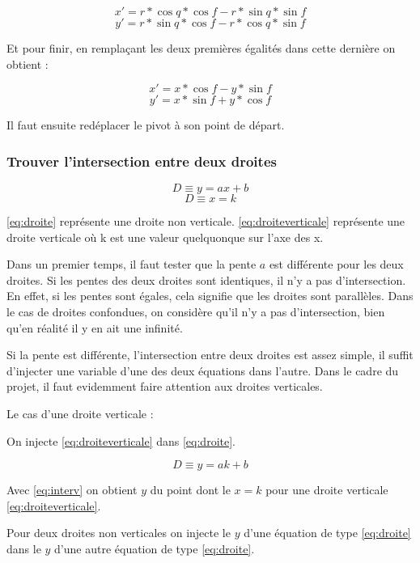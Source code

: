 \documentclass[]{article}
\begin{document}
$$ x' = r * \cos{q} * \cos{f} - r * \sin{q} * \sin{f} $$
$$ y' = r * \sin{q} * \cos{f} - r * \cos{q} * \sin{f} $$

Et pour finir, en remplaçant les deux premières égalités dans cette dernière on obtient : 

$$ x' = x * \cos{f} - y * \sin{f} $$
$$ y' = x * \sin{f} + y * \cos{f} $$

Il faut ensuite redéplacer le pivot à son point de départ.

\subsubsection{Trouver l'intersection entre deux droites}



\begin{equation} \label{eq:droite}
	D \equiv y = ax + b 
\end{equation}
\begin{equation} \label{eq:droiteverticale}
	D \equiv x = k 
\end{equation}


\eqref {eq:droite} 
représente une droite non verticale.
\eqref {eq:droiteverticale} 
représente une droite verticale où k est une valeur
quelquonque sur l'axe des x.

Dans un premier temps, il faut tester que la pente $a$ est différente 
pour les deux droites. 
Si les pentes des deux droites sont identiques, il n'y a pas d'intersection.
En effet, si les pentes sont égales, cela signifie que les droites sont parallèles.
Dans le cas de droites confondues, on considère qu'il
n'y a pas d'intersection, bien qu'en réalité il y en ait une infinité.

Si la pente est différente,
l'intersection entre deux droites est assez simple, il suffit 
d'injecter une variable d'une des deux équations dans l'autre.
Dans le cadre du projet, il faut evidemment faire attention aux 
droites verticales.

Le cas d'une droite verticale : 

On injecte \eqref{eq:droiteverticale} dans \eqref{eq:droite}.

\begin{equation} \label{eq:interv}
	D \equiv y = ak + b
\end{equation}

Avec \eqref{eq:interv} on obtient $y$ du point dont le $x = k$
pour une droite verticale \eqref{eq:droiteverticale}.

Pour deux droites non verticales on injecte le $y$ d'une équation
de type \eqref{eq:droite} dans le $y$ d'une autre équation de type \eqref{eq:droite}.
\end{document}
